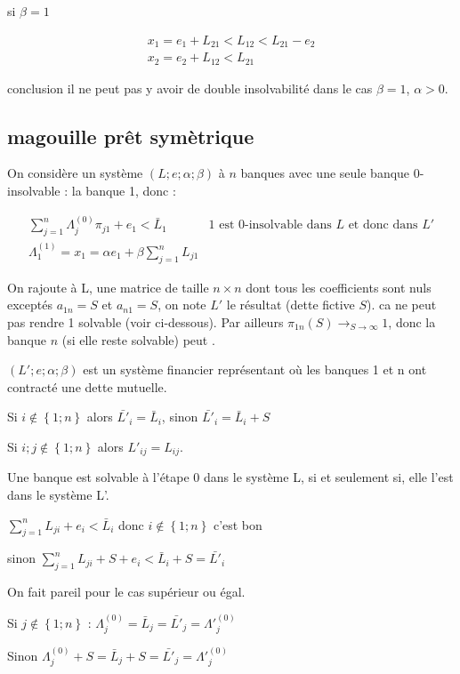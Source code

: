 \documentclass{article}
\def\AR#1{
\[
\begin{array}{llllllll}
#1
\end{array}
\]
}
\begin{document}
si $\beta=1$
\AR{
x_1 = e_1 + L_{21} < L_{12} < L_{21} - e_2\\
x_2 = e_2 + L_{12} < L_{21}
}
conclusion il ne peut pas y avoir de double insolvabilité dans le cas $\beta=1$, $\alpha >0$.

\subsection{magouille prêt symètrique}
On considère un système $(L; e ; \alpha ; \beta)$ à $n$ banques avec une seule banque 0-insolvable : la banque 1, donc :

\AR{
\sum_{j=1}^{n} \Lambda^{(0)}_{j} \pi_{j1} + e_{1} <  \bar{L}_{1}
& \text{1 est 0-insolvable dans $L$ et donc dans $L'$}
\\
\Lambda^{(1)}_{1} = x_{1} = \alpha e_{1} + \beta \sum_{j=1}^{n} L_{j1}
}

On rajoute à L, une matrice de taille $n\times n$  dont tous les coefficients sont nuls exceptés $a_{1n}=S$ et $a_{n1}=S$, on note $L'$ le résultat (dette fictive $S$). ca ne peut pas rendre 1 solvable (voir ci-dessous). Par ailleurs 
$\pi_{1n}(S)\to_{S\to\infty} 1$,
donc la banque $n$ (si elle reste solvable)
peut .

$(L'; e ; \alpha ; \beta)$ est un système financier représentant où les banques 1 et n ont contracté une dette mutuelle.


Si $i \notin \left\lbrace 1; n \right\rbrace$ alors $\bar{L'}_{i} = \bar{L}_{i}$, sinon $\bar{L'}_{i} = \bar {L}_{i} + S$

Si $i;j \notin \left\lbrace 1; n \right\rbrace$ alors $L'_{ij} = L_{ij}$.


Une banque est solvable à l'étape 0 dans le système L, si et seulement si, elle l'est dans le système L'.


$\sum_{j=1}^{n} L_{ji} + e_{i} <  \bar{L}_{i}$ donc $i \notin \left\lbrace 1; n \right\rbrace$ c'est bon

sinon $\sum_{j=1}^{n} L_{ji} + S + e_{i} <  \bar{L}_{i} + S = \bar{L'}_{i}$
 
On fait pareil pour le cas supérieur ou égal.

\begin{center}
Si $j \notin \left\lbrace 1; n \right\rbrace$ : $\Lambda^{(0)}_{j} = \bar{L}_{j} = \bar{L'}_{j} = \Lambda'^{(0)}_{j} $

Sinon $\Lambda^{(0)}_{j} + S = \bar{L}_{j} + S = \bar{L'}_{j} = \Lambda'^{(0)}_{j} $
\end{center}
\end{document}
